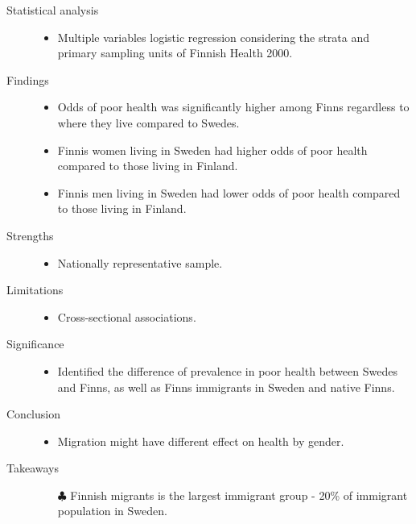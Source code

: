 \documentclass{article}
\begin{document}
\begin{itemize}
\begin{description}
			\item[Statistical analysis]\mbox{}\par 
				\begin{itemize}
					\item Multiple variables logistic regression considering the strata and primary sampling units of Finnish Health 2000.
				\end{itemize}
			\item[Findings] \mbox{}\par
				\begin{itemize}
					\item Odds of poor health was significantly higher among Finns regardless to where they live compared to Swedes.
					\item Finnis women living in Sweden had higher odds of poor health compared to those living in Finland.
					\item Finnis men living in Sweden had lower odds of poor health compared to those living in Finland.
				\end{itemize}
			\item[Strengths] \mbox{}\par
				\begin{itemize}
					\item Nationally representative sample.
				\end{itemize}
			\item[Limitations] \mbox{}\par
				\begin{itemize}
					\item Cross-sectional associations.
				\end{itemize}
			\item[Significance]\mbox{}\par
				\begin{itemize}
					\item Identified the difference of prevalence in poor health between Swedes and Finns, as well as Finns immigrants in Sweden and native Finns.
				\end{itemize}
			\item[Conclusion]\mbox{}\par
				\begin{itemize}
					\item Migration might have different effect on health by gender.
				\end{itemize}
			\item[Takeaways] \mbox{}\par
				\begin{itemize}
					\item[$\clubsuit$] Finnish migrants is the largest immigrant group - 20\% of immigrant population in Sweden.
				\end{itemize}
		\end{description}
\end{itemize} %
\end{document}
